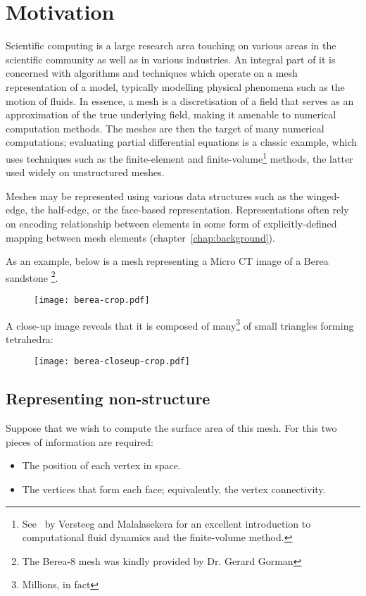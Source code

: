 \section{Motivation}
Scientific computing is a large research area touching on various areas in the scientific community as well as in various industries. An integral part of it is concerned with algorithms and techniques which operate on a mesh representation of a model, typically modelling physical phenomena such as the motion of fluids. In essence, a mesh is a discretisation of a field that serves as an approximation of the true underlying field, making it amenable to numerical computation methods. The meshes are then the target of many numerical computations; evaluating partial differential equations is a classic example, which uses techniques such as the finite-element and finite-volume\footnote{See~\cite{versteeg2007introduction} by Versteeg and Malalasekera for an excellent introduction to computational fluid dynamics and the finite-volume method.} methods, the latter used widely on unstructured meshes.

Meshes may be represented using various data structures such as the winged-edge, the half-edge, or the face-based representation. Representations often rely on encoding relationship between elements in some form of explicitly-defined mapping between mesh elements (chapter~\ref{chap:background}).

\pagebreak
As an example, below is a mesh representing a Micro CT image of a Berea sandstone \footnote{The Berea-8 mesh was kindly provided by Dr. Gerard Gorman}.


\begin{figure}[H]
\centering
\texttt{[image: berea-crop.pdf]}
\end{figure}

A close-up image reveals that it is composed of many\footnote{Millions, in fact} of small triangles forming tetrahedra:

\begin{figure}[H]
\centering
\texttt{[image: berea-closeup-crop.pdf]}
\end{figure}

\pagebreak
\subsection{Representing non-structure}
Suppose that we wish to compute the surface area of this mesh. For this two pieces of information are required:
\begin{itemize}
\item The position of each vertex in space.
\item The vertices that form each face; equivalently, the vertex connectivity.
\end{itemize}

